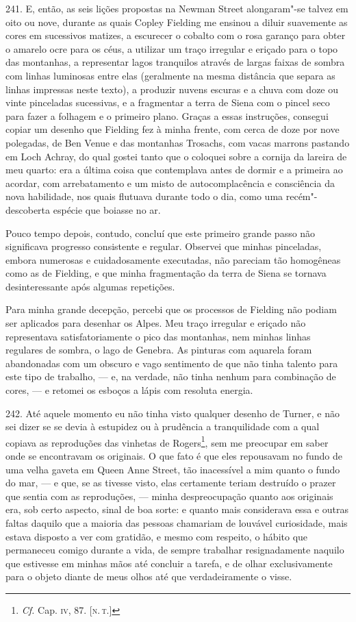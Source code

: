 241. E, então, as seis lições propostas na Newman Street alongaram"-se
talvez em oito ou nove, durante as quais Copley Fielding me ensinou a
diluir suavemente as cores em sucessivos matizes, a escurecer o cobalto
com o rosa garanço para obter o amarelo ocre para os céus, a utilizar um
traço irregular e eriçado para o topo das montanhas, a representar lagos
tranquilos através de largas faixas de sombra com linhas luminosas entre
elas (geralmente na mesma distância que separa as linhas impressas neste
texto), a produzir nuvens escuras e a chuva com doze ou vinte pinceladas
sucessivas, e a fragmentar a terra de Siena com o pincel seco para fazer
a folhagem e o primeiro plano. Graças a essas instruções, consegui
copiar um desenho que Fielding fez à minha frente, com cerca de doze por
nove polegadas, de Ben Venue e das montanhas Trosachs, com vacas marrons
pastando em Loch Achray, do qual gostei tanto que o coloquei sobre a
cornija da lareira de meu quarto: era a última coisa que contemplava
antes de dormir e a primeira ao acordar, com arrebatamento e um misto de
autocomplacência e consciência da nova habilidade, nos quais flutuava
durante todo o dia, como uma recém"-descoberta espécie que boiasse no ar.

Pouco tempo depois, contudo, concluí que este primeiro grande passo não
significava progresso consistente e regular. Observei que minhas
pinceladas, embora numerosas e cuidadosamente executadas, não pareciam
tão homogêneas como as de Fielding, e que minha fragmentação da terra de
Siena se tornava desinteressante após algumas repetições.

Para minha grande decepção, percebi que os processos de Fielding não
podiam ser aplicados para desenhar os Alpes. Meu traço irregular e
eriçado não representava satisfatoriamente o pico das montanhas, nem
minhas linhas regulares de sombra, o lago de Genebra. As pinturas com
aquarela foram abandonadas com um obscuro e vago sentimento de que não
tinha talento para este tipo de trabalho, --- e, na verdade, não tinha
nenhum para combinação de cores, --- e retomei os esboços a lápis com
resoluta energia.

242. Até aquele momento eu não tinha visto qualquer desenho de Turner, e
não sei dizer se se devia à estupidez ou à prudência a tranquilidade com
a qual copiava as reproduções das vinhetas de Rogers\footnote{\emph{Cf.}
  Cap. \textsc{iv}, 87. {[}\textsc{n.\,t.}{]}}, sem me preocupar em saber onde se
encontravam os originais. O que fato é que eles repousavam no fundo de
uma velha gaveta em Queen Anne Street, tão inacessível a mim quanto o
fundo do mar, --- e que, se as tivesse visto, elas certamente teriam
destruído o prazer que sentia com as reproduções, --- minha
despreocupação quanto aos originais era, sob certo aspecto, sinal de boa
sorte: e quanto mais considerava essa e outras faltas daquilo que a
maioria das pessoas chamariam de louvável curiosidade, mais estava
disposto a ver com gratidão, e mesmo com respeito, o hábito que
permaneceu comigo durante a vida, de sempre trabalhar resignadamente
naquilo que estivesse em minhas mãos até concluir a tarefa, e de olhar
exclusivamente para o objeto diante de meus olhos até que
verdadeiramente o visse.

